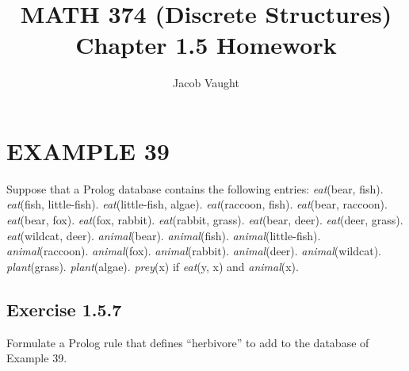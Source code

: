 \documentclass[12pt]{article}
\title{MATH 374 (Discrete Structures)\\Chapter 1.5 Homework}
\author{Jacob Vaught}
\begin{document}
\maketitle

\section*{EXAMPLE 39}

Suppose that a Prolog database contains the following entries:
\newline
\textit{eat}(bear, fish).\newline
\textit{eat}(fish, little-fish).\newline
\textit{eat}(little-fish, algae).\newline
\textit{eat}(raccoon, fish).\newline
\textit{eat}(bear, raccoon).\newline
\textit{eat}(bear, fox).\newline
\textit{eat}(fox, rabbit).\newline
\textit{eat}(rabbit, grass).\newline
\textit{eat}(bear, deer).\newline
\textit{eat}(deer, grass).\newline
\textit{eat}(wildcat, deer).\newline
\textit{animal}(bear).\newline
\textit{animal}(fish).\newline
\textit{animal}(little-fish).\newline
\textit{animal}(raccoon).\newline
\textit{animal}(fox).\newline
\textit{animal}(rabbit).\newline
\textit{animal}(deer).\newline
\textit{animal}(wildcat).\newline
\textit{plant}(grass).\newline
\textit{plant}(algae).\newline
\textit{prey}(x) if \textit{eat}(y, x) and \textit{animal}(x).\newline

\newpage
\subsection*{Exercise 1.5.7}

Formulate a Prolog rule that defines “herbivore” to add to the database of Example 39.
\end{document}
